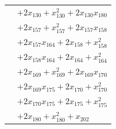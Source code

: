 \begin{longtable}{@{}r@{\;}l@{}}
 & \(\displaystyle +2x_{130} +x_{130}^{2} +2x_{130}x_{180}\) \\
 & \(\displaystyle +2x_{157} +x_{157}^{2} +2x_{157}x_{158}\) \\
 & \(\displaystyle +2x_{157}x_{164} +2x_{158} +x_{158}^{2}\) \\
 & \(\displaystyle +2x_{158}x_{164} +2x_{164} +x_{164}^{2}\) \\
 & \(\displaystyle +2x_{169} +x_{169}^{2} +2x_{169}x_{170}\) \\
 & \(\displaystyle +2x_{169}x_{175} +2x_{170} +x_{170}^{2}\) \\
 & \(\displaystyle +2x_{170}x_{175} +2x_{175} +x_{175}^{2}\) \\
 & \(\displaystyle +2x_{180} +x_{180}^{2} +x_{202}\) \\[3pt]
\end{longtable}
\endgroup
